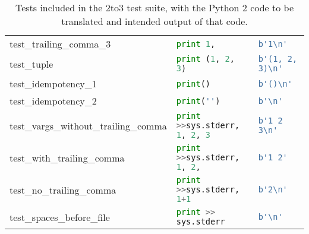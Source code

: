 \begin{table*}[htb]
\begin{tabular}{@{}l|ll@{}}
    test\_trailing\_comma\_3              & \lstinline[language=Python, style=pythonstyle]|print 1,                                             | & \lstinline[language=Python, style=pythonstyle]|b'1\n'                 | \\
    test\_tuple                           & \lstinline[language=Python, style=pythonstyle]|print (1, 2, 3)                                      | & \lstinline[language=Python, style=pythonstyle]|b'(1, 2, 3)\n'         | \\
    test\_idempotency\_1                  & \lstinline[language=Python, style=pythonstyle]|print()                                              | & \lstinline[language=Python, style=pythonstyle]|b'()\n'                | \\
    test\_idempotency\_2                  & \lstinline[language=Python, style=pythonstyle]|print('')                                            | & \lstinline[language=Python, style=pythonstyle]|b'\n'                  | \\
    test\_vargs\_without\_trailing\_comma & \lstinline[language=Python, style=pythonstyle]|print >>sys.stderr, 1, 2, 3| & \lstinline[language=Python, style=pythonstyle]|b'1 2 3\n'             | \\
    test\_with\_trailing\_comma           & \lstinline[language=Python, style=pythonstyle]|print >>sys.stderr, 1, 2,  | & \lstinline[language=Python, style=pythonstyle]|b'1 2'                                | \\
    test\_no\_trailing\_comma             & \lstinline[language=Python, style=pythonstyle]|print >>sys.stderr, 1+1    | & \lstinline[language=Python, style=pythonstyle]|b'2\n'                 | \\
    test\_spaces\_before\_file            & \lstinline[language=Python, style=pythonstyle]|print >> sys.stderr          | & \lstinline[language=Python, style=pythonstyle]|b'\n'                  | \\ \bottomrule
    \end{tabular}
    \caption{Tests included in the 2to3 test suite, with the Python 2 code to be translated and intended output of that code.}
    \label{table:tests}
\end{table*}